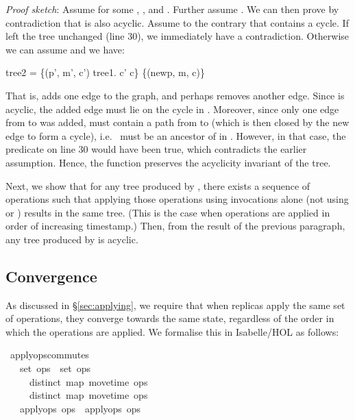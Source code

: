 \documentclass[sigplan,anonymous]{acmart}
\renewenvironment{isabelle}{%
  \medbreak\noindent%
  \renewcommand{\isanewline}{\\}%
  \begin{minipage}{\columnwidth}%
  \begin{isabellebody}%
  \begin{tabbing}%
}{%
  \end{tabbing}%
  \end{isabellebody}%
  \end{minipage}%
  \medbreak%
}
\renewcommand{\isacartoucheopen}{}
\renewcommand{\isacartoucheclose}{}
\begin{document}
\emph{Proof sketch}: Assume  for some , ,  and .
Further assume .
We can then prove by contradiction that  is also acyclic.
Assume to the contrary that  contains a cycle.
If  left the tree unchanged (line 30), we immediately have a contradiction.
Otherwise we can assume  and we have:
\begin{isabelle}
tree2 = \{(p', m', c') {\isasymin} tree1. c' {\isasymnoteq} c\} {\isasymunion} \{(newp, m, c)\}
\end{isabelle}
That is,  adds one edge  to the graph, and perhaps removes another edge.
Since  is acyclic, the added edge must lie on the cycle in .
Moreover, since only one edge from  to  was added,  must contain a path from  to  (which is then closed by the new edge to form a cycle), i.e.\  must be an ancestor of  in .
However, in that case, the predicate  on line 30 would have been true, which contradicts the earlier assumption.
Hence, the  function preserves the acyclicity invariant of the tree.

Next, we show that for any tree produced by , there exists a sequence of operations such that applying those operations using  invocations alone (not using  or ) results in the same tree.
(This is the case when operations are applied in order of increasing timestamp.)
Then, from the result of the previous paragraph, any tree produced by  is acyclic.

\subsection{Convergence}\label{sec:convergence}

As discussed in \S\ref{sec:applying}, we require that when replicas apply the same set of operations, they converge towards the same state, regardless of the order in which the operations are applied.
We formalise this in Isabelle/HOL as follows:
\begin{isabelle}
\isamarkupfalse%
\ apply{\isacharunderscore}ops{\isacharunderscore}commutes{\isacharcolon}\isanewline
\ \ \ {\isacartoucheopen}set\ ops{}\ {\isacharequal}\ set\ ops{}{\isacartoucheclose}\isanewline
\ \ \ \ \ {\isacartoucheopen}distinct\ {\isacharparenleft}map\ move{\isacharunderscore}time\ ops{}{\isacharparenright}{\isacartoucheclose}\isanewline
\ \ \ \ \ {\isacartoucheopen}distinct\ {\isacharparenleft}map\ move{\isacharunderscore}time\ ops{}{\isacharparenright}{\isacartoucheclose}\isanewline
\ \ \ {\isacartoucheopen}apply{\isacharunderscore}ops\ ops{}\ {\isacharequal}\ apply{\isacharunderscore}ops\ ops{}{\isacartoucheclose}
\end{isabelle}
\end{document}
